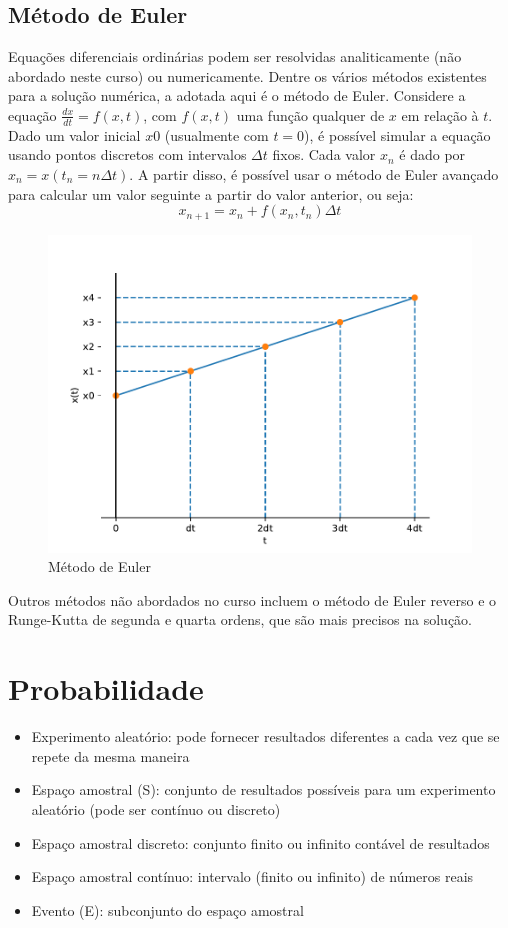 \subsection{Método de Euler}
Equações diferenciais ordinárias podem ser resolvidas analiticamente (não abordado neste curso) ou numericamente. Dentre os vários métodos existentes para a solução numérica, a adotada aqui é o método de Euler. Considere a equação $\frac{dx}{dt}=f(x,t)$, com $f(x,t)$ uma função qualquer de $x$ em relação à $t$. Dado um valor inicial $x0$ (usualmente com $t=0$), é possível simular a equação usando pontos discretos com intervalos $\Delta t$ fixos. Cada valor $x_n$ é dado por $x_n=x(t_n=n\Delta t)$. A partir disso, é possível usar o método de Euler avançado para calcular um valor seguinte a partir do valor anterior, ou seja:
$$
x_{n+1}=x_n+f(x_n,t_n)\Delta t
$$

\begin{figure}[htb!]
	\centering
	\caption{Método de Euler}
	\label{fig:euler}
	\includegraphics[width=0.7\linewidth]{figs/euler}
\end{figure}

Outros métodos não abordados no curso incluem o método de Euler reverso e o Runge-Kutta de segunda e quarta ordens, que são mais precisos na solução.

\section{Probabilidade}\label{sec:probabilidade}
\begin{itemize}
	\item Experimento aleatório: pode fornecer resultados diferentes a cada vez que se repete da mesma maneira
	\item Espaço amostral (S): conjunto de resultados possíveis para um experimento aleatório (pode ser contínuo ou discreto)
	\item Espaço amostral discreto: conjunto finito ou infinito contável de resultados
	\item Espaço amostral contínuo: intervalo (finito ou infinito) de números reais
	\item Evento (E): subconjunto do espaço amostral
\end{itemize}


